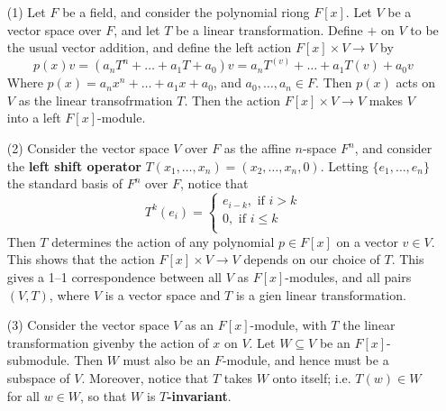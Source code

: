 \begin{example}[Polynomials]\label{}
    \begin{enumerate}
        \item[(1)] Let $F$ be a field, and consider the polynomial riong
            $F[x]$. Let $V$ be a vector space over  $F$, and let  $T$ be a
            linear transformation. Define  $+$ on  $V$ to be the usual vector
            addition, and define the left action  $F[x] \times V \xrightarrow{}
            V$ by
            \begin{equation*}
                p(x)v=(a_nT^n+\dots+a_1T+a_0)v=a_nT^(v)+\dots+a_1T(v)+a_0v
            \end{equation*}
            Where $p(x)=a_nx^n+\dots+a_1x+a_0$, and $a_0, \dots, a_n \in F$.
            Then $p(x)$ acts on $V$ as the linear transofrmation $T$. Then the
            action $F[x] \times V \xrightarrow{} V$ makes $V$ into a left
            $F[x]$-module.

        \item[(2)] Consider the vector space $V$ over $F$ as the affine $n$-space
            $F^n$, and consider the \textbf{left shift operator} $T(x_1, \dots,
            x_n)=(x_2, \dots, x_n,0)$. Letting $\{e_1, \dots, e_n\}$ the
            standard basis of $F^n$ over  $F$, notice that
            \begin{equation*}
                T^k(e_i)=\begin{cases}
                            e_{i-k}, \text{ if } i>k    \\
                            0, \text{ if } i \leq k \\
                         \end{cases}
            \end{equation*}
            Then $T$ determines the action of any polynomial $p \in F[x]$ on a
            vector $v \in V$. This shows that the action  $F[x] \times V
            \xrightarrow{} V$ depends on our choice of $T$. This gives a  1--1
            correspondence between all $V$ as $F[x]$-modules, and all pairs
            $(V,T)$, where $V$ is a vector space and  $T$ is a gien linear
            transformation.

        \item [(3)] Consider the vector space $V$ as an $F[x]$-module, with $T$
            the linear transformation givenby the action of  $x$ on  $V$. Let
            $W \subseteq V$ be an  $F[x]$-submodule. Then $W$ must also be an
            $F$-module, and hence must be a subspace of  $V$. Moreover, notice
            that $T$ takes $W$ onto itself; i.e.  $T(w) \in W$ for all $w \in
            W$, so that  $W$ is  \textbf{$T$-invariant}.


\end{enumerate}
\end{example}
